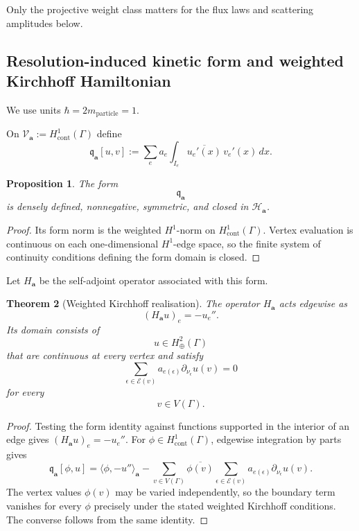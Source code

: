 \documentclass[11pt]{article}
\theoremstyle{plain}
\newtheorem{theorem}{Theorem}[section]
\newtheorem{proposition}[theorem]{Proposition}
\theoremstyle{definition}
\begin{document}
Only the projective weight class matters for the flux laws and scattering amplitudes below.

\subsection{Resolution-induced kinetic form and weighted Kirchhoff Hamiltonian}
\label{subsec:weighted-form}

We use units
\(\hbar=2m_{\mathrm{particle}}=1\).

On \(\mathcal V_{\mathbf a} := H^1_{\mathrm{cont}}(\Gamma)\) define
\[
  \mathfrak q_{\mathbf a}[u,v]
  :=
  \sum_{e}
  a_e
  \int_{I_e}
  \overline{u_e'(x)}\,v_e'(x)\,dx.
\]

\begin{proposition}
\label{prop:weighted-form-closed}
The form
\[
  \mathfrak q_{\mathbf a}
\]
is densely defined, nonnegative, symmetric, and closed in
\(\mathcal H_{\mathbf a}\).
\end{proposition}

\begin{proof}
Its form norm is the weighted \(H^1\)-norm on
\(H^1_{\mathrm{cont}}(\Gamma)\). Vertex evaluation is continuous on each
one-dimensional \(H^1\)-edge space, so the finite system of continuity
conditions defining the form domain is closed.
\end{proof}

Let \(H_{\mathbf a}\) be the self-adjoint operator associated with this form.

\begin{theorem}[Weighted Kirchhoff realisation]
\label{thm:weighted-kirchhoff}
The operator \(H_{\mathbf a}\) acts edgewise as
\[
  (H_{\mathbf a}u)_e=-u_e''.
\]
Its domain consists of
\[
  u\in H^2_\oplus(\Gamma)
\]
that are continuous at every vertex and satisfy
\[
  \sum_{\epsilon\in\mathcal E(v)}
  a_{e(\epsilon)}
  \partial_{\nu_\epsilon}u(v)
  =
  0
\]
for every
\[
  v\in V(\Gamma).
\]
\end{theorem}

\begin{proof}
Testing the form identity against functions supported in the interior of an
edge gives
\((H_{\mathbf a}u)_e=-u_e''\).
For
\(\phi\in H^1_{\mathrm{cont}}(\Gamma)\),
edgewise integration by parts gives
\[
  \mathfrak q_{\mathbf a}[\phi,u]
  =
  \langle \phi,-u''\rangle_{\mathbf a}
  -
  \sum_{v\in V(\Gamma)}
  \overline{\phi(v)}
  \sum_{\epsilon\in\mathcal E(v)}
  a_{e(\epsilon)}
  \partial_{\nu_\epsilon}u(v).
\]
The vertex values \(\phi(v)\) may be varied independently, so the boundary
term vanishes for every \(\phi\) precisely under the stated weighted
Kirchhoff conditions. The converse follows from the same identity.
\end{proof}
\end{document}
